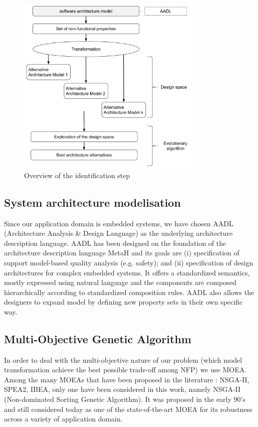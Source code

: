 \documentclass[conference]{IEEEtran}
\begin{document}
\begin{figure}[!t]
\centering
\includegraphics[width=3.49in]{IDMT.pdf}
\caption{Overview of the identification step}
\label{IS}
\end{figure}

\subsection{System architecture modelisation}
Since our application domain is embedded systems, we have chosen AADL (Architecture Analysis \& Design Language) as the underlying architecture description language. AADL has been designed on the foundation of the architecture description language MetaH and its goals are (i) specification of support model-based quality analysis (e.g. safety); and (ii) specification of design architectures for complex embedded systems. It offers a standardized semantics, mostly expressed using natural language and the components are composed hierarchically according to standardized composition rules. AADL also allows the designers to expand model by defining new property sets in their own specific way.

\subsection{Multi-Objective Genetic Algorithm}
In order to deal with the multi-objective nature of our problem (which model transformation achieve the best possible trade-off among NFP) we use MOEA. 
Among the many MOEAs that have been proposed in the literature : NSGA-II\cite{Deb:2002:FEM:2221359.2221582}, SPEA2\cite{Zitzler01spea2:improving}, IBEA\cite{Zitzler04indicatorbasedselection}, only one have been considered in this work, namely NSGA-II (Non-dominated Sorting Genetic Algorithm). It was proposed in the early 90's and still considered today as one of the state-of-the-art MOEA for its robustness across a variety of application domain.
\end{document}
